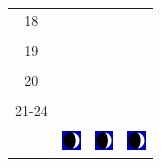 \documentclass[twoside, a4paper,12pt, tikz]{scrartcl}
\begin{document}
\begin{tabularx}{\linewidth}{|c|X|X|X|}
        &   &       &    \\
      \hline
      18&   &       &    \\
        &   &       &    \\
      \hline
      19&   &       &    \\
        &   &       &    \\
      \hline
      20&   &       &    \\
        &   &       &    \\
      \hline
      21-24&   &       &    \\
        &   &       &    \\
      \hline  
      & \vspace{0.01cm} \centerline{\includegraphics[width=0.5cm]{moon_phases/Moon_phase_1.svg.png}} \vspace{0.1cm} & \vspace{0.01cm} \centerline{\includegraphics[width=0.5cm]{moon_phases/Moon_phase_1.svg.png}} \vspace{0.1cm} & \vspace{0.01cm} \centerline{\includegraphics[width=0.5cm]{moon_phases/Moon_phase_1.svg.png}} \vspace{0.1cm}\\
      \hline   
    \end{tabularx}




    \newpage

        \noindent
\end{document}
